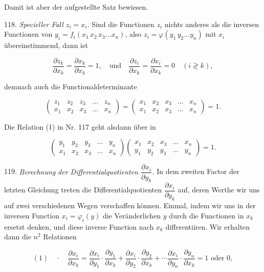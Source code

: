 \documentclass[11pt]{article}
\begin{document}
Damit ist aber der aufgestellte Satz bewiesen.

118. \textit{Specieller Fall $z_i = x_i$.} Sind die Functionen $z_i$ nichts
anderes als die inversen Functionen von $y_i = f_i(x_1\, x_2\, x_3 \ldots x_n)$, also
$z_i = \varphi(y_1\, y_2 \ldots y_n)$ mit $x_i$ übereinstimmend, dann ist

\[
\dfrac{\partial z_k}{\partial x_k} = \dfrac{\partial x_k}{\partial x_k} = 1, \quad \text{und} \quad \dfrac{\partial z_i}{\partial x_k} = \dfrac{\partial x_i}{\partial x_k} = 0 \quad (i \gtrless k),
\]

demnach auch die Functionaldeterminante

\[
\begin{pmatrix} z_1 & z_2 & z_3 & \ldots & z_n \\ x_1 & x_2 & x_3 & \ldots & x_n \end{pmatrix}
=
\begin{pmatrix} x_1 & x_2 & x_3 & \ldots & x_n \\ x_1 & x_2 & x_3 & \ldots & x_n \end{pmatrix}
= 1.
\]

Die Relation (1) in Nr. 117 geht alsdann über in

\[
\begin{pmatrix} y_1 & y_2 & y_3 & \ldots & y_n \\ x_1 & x_2 & x_3 & \ldots & x_n \end{pmatrix}
\begin{pmatrix} x_1 & x_2 & x_3 & \ldots & x_n \\ y_1 & y_2 & y_3 & \ldots & y_n \end{pmatrix}
= 1.
\]

119. \textit{Berechnung der Differentialquotienten $\dfrac{\partial x_i}{\partial y_k}$.} In dem zweiten
Factor der letzten Gleichung treten die Differentialquotienten $\dfrac{\partial x_i}{\partial y_k}$ auf,
deren Werthe wir uns auf zwei verschiedenen Wegen verschaffen
können. Einmal, indem wir uns in der inversen Function $x_i = \varphi_i(y)$
die Veränderlichen $y$ durch die Functionen in $x_k$ ersetzt denken, und
diese inverse Function nach $x_k$ differentiiren. Wir erhalten dann die
$n^2$ Relationen

\[
(1) \quad\cdot\quad \dfrac{\partial x_i}{\partial x_k} = \dfrac{\partial x_i}{\partial y_1}\cdot\dfrac{\partial y_1}{\partial x_k} + \dfrac{\partial x_i}{\partial y_2}\cdot\dfrac{\partial y_2}{\partial x_k} + \cdots \dfrac{\partial x_i}{\partial y_n}\cdot\dfrac{\partial y_n}{\partial x_k} = 1 \text{ oder } 0,
\]
\end{document}

